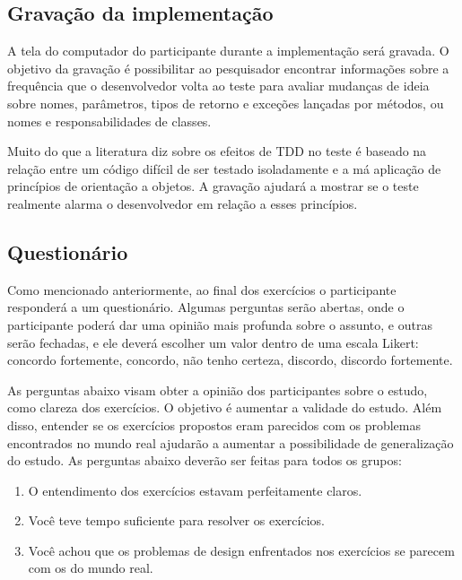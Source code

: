 \subsection{Gravação da implementação}
\label{sec:planejamento-gravacao}

A tela do computador do participante durante a implementação será gravada. 
O objetivo da gravação é possibilitar ao pesquisador encontrar informações
sobre a frequência que o desenvolvedor volta ao teste para avaliar mudanças de ideia sobre
nomes, parâmetros, tipos de retorno e exceções lançadas por métodos, ou nomes
e responsabilidades de classes.

Muito do que a literatura diz sobre os efeitos de TDD no teste é baseado
na relação entre um código difícil de ser testado isoladamente e a má aplicação
de princípios de orientação a objetos. A gravação ajudará a mostrar se o teste
realmente alarma o desenvolvedor em relação a esses princípios.

\subsection{Questionário}
\label{sec:questionario}

Como mencionado anteriormente, ao final dos exercícios o participante responderá a um questionário.
Algumas
perguntas serão abertas, onde o participante poderá dar uma opinião mais profunda sobre o assunto,
e outras serão fechadas, e ele deverá escolher um valor dentro de uma escala
Likert: concordo fortemente, concordo, não tenho certeza,
discordo, discordo fortemente.

As perguntas abaixo visam obter a opinião dos participantes sobre o estudo, como clareza dos
exercícios. O objetivo é aumentar a validade do estudo.
Além disso, entender se os exercícios propostos eram parecidos com os problemas encontrados no mundo
real ajudarão a aumentar a possibilidade de generalização do estudo. As perguntas abaixo deverão
ser feitas para todos os grupos:

\begin{enumerate}
	\item O entendimento dos exercícios estavam perfeitamente claros.
	\item Você teve tempo suficiente para resolver os exercícios.
	\item Você achou que os problemas de design enfrentados nos exercícios se parecem com os do mundo real.
\end{enumerate}


